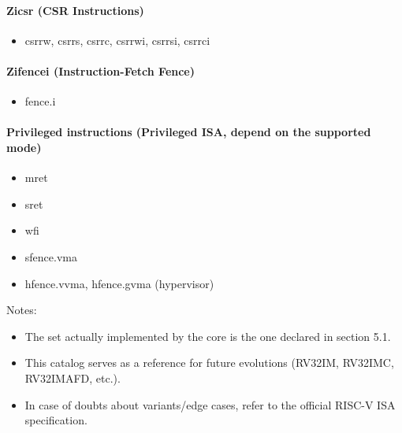 \documentclass[]{article}
\providecommand{\tightlist}{%
  \setlength{\itemsep}{0pt}\setlength{\parskip}{0pt}}
\let\oldparagraph\paragraph
\renewcommand{\paragraph}[1]{\oldparagraph{#1}\mbox{}}
\begin{document}
\hypertarget{zicsr-csr-instructions}{%
\paragraph{Zicsr (CSR Instructions)}\label{zicsr-csr-instructions}}

\begin{itemize}
\tightlist
\item
  csrrw, csrrs, csrrc, csrrwi, csrrsi, csrrci
\end{itemize}

\hypertarget{zifencei-instruction-fetch-fence}{%
\paragraph{Zifencei (Instruction-Fetch
Fence)}\label{zifencei-instruction-fetch-fence}}

\begin{itemize}
\tightlist
\item
  fence.i
\end{itemize}

\hypertarget{privileged-instructions-privileged-isa-depend-on-the-supported-mode}{%
\paragraph{Privileged instructions (Privileged ISA, depend on the
supported
mode)}\label{privileged-instructions-privileged-isa-depend-on-the-supported-mode}}

\begin{itemize}
\tightlist
\item
  mret
\item
  sret
\item
  wfi
\item
  sfence.vma
\item
  hfence.vvma, hfence.gvma (hypervisor)
\end{itemize}

Notes:

\begin{itemize}
\tightlist
\item
  The set actually implemented by the core is the one declared in
  section 5.1.
\item
  This catalog serves as a reference for future evolutions (RV32IM,
  RV32IMC, RV32IMAFD, etc.).
\item
  In case of doubts about variants/edge cases, refer to the official
  RISC-V ISA specification.
\end{itemize}
\end{document}
